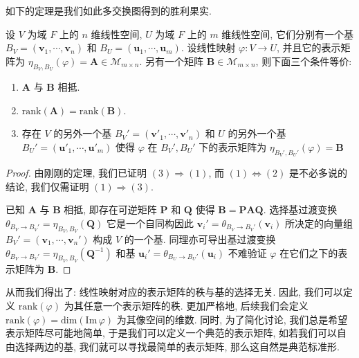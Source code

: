 \documentclass[UTF8]{book}
\begin{document}
如下的定理是我们如此多交换图得到的胜利果实. 

\begin{theorem}
    设 $V$ 为域 $F$ 上的 $n$ 维线性空间, 
    $U$ 为域 $F$ 上的 $m$ 维线性空间, 它们分别有一个基 
    $B_V=(\boldsymbol{v}_1,\cdots,\boldsymbol{v}_n)$ 
    和 $B_U=(\boldsymbol{u}_1,\cdots,\boldsymbol{u}_m)$. 
    设线性映射 $\varphi : V \to U$, 并且它的表示矩阵为 
    $\eta_{B_V,B_U}(\varphi) =\boldsymbol{A} \in 
    \mathcal{M}_{m\times n}$. 
    另有一个矩阵 $\boldsymbol{B} \in \mathcal{M}_{m\times n} $, 
    则下面三个条件等价: 
    \begin{enumerate}[(1)]
        \item $\boldsymbol{A}$ 与 $\boldsymbol{B}$ 相抵. 
        \item $\mathrm{rank}(\boldsymbol{A})=
        \mathrm{rank}(\boldsymbol{B})$. 
        \item 存在 $V$ 的另外一个基 
        $B_V'=(\boldsymbol{v}'_1,\cdots,\boldsymbol{v}'_n)$ 
        和 $U$ 的另外一个基 
        $B_U'=(\boldsymbol{u}'_1,\cdots,\boldsymbol{u}'_m)$ 
        使得 $\varphi$ 在 $B_V',B_U'$ 下的表示矩阵为 
        $\eta_{B_V',B_U'}(\varphi) = \boldsymbol{B}$
    \end{enumerate}
\end{theorem}

\begin{proof}
    由刚刚的定理, 我们已证明 $(3) \Rightarrow (1)$, 
    而 $(1)\Leftrightarrow(2)$ 是不必多说的结论, 
    我们仅需证明 $(1) \Rightarrow (3)$. 

    已知 $\boldsymbol{A}$ 与 $\boldsymbol{B}$ 相抵, 
    即存在可逆矩阵 $\boldsymbol{P}$ 和 $\boldsymbol{Q}$ 
    使得 $\boldsymbol{B} = \boldsymbol{P}\boldsymbol{A}\boldsymbol{Q}$. 
    选择基过渡变换 
    $\theta_{B_V \to B_V'} = \eta_{B_V,B_V}(\boldsymbol{Q})$ 
    它是一个自同构因此 
    $\boldsymbol{v}_i' = \theta_{B_V \to B_V'}(\boldsymbol{v}_i)$ 
    所决定的向量组 $B_V'= (\boldsymbol{v}_1,\cdots,\boldsymbol{v}_n')$ 
    构成 $V$ 的一个基. 
    同理亦可导出基过渡变换 
    $\theta_{B_V \to B_V'} = \eta_{B_V,B_V}(\boldsymbol{Q}^{-1})$ 
    和基 
    $\boldsymbol{u}_i' = \theta_{B_U \to B_U'}(\boldsymbol{u}_i)$ 
    不难验证 $\varphi$ 在它们之下的表示矩阵为 $\boldsymbol{B}$. 

\end{proof}

从而我们得出了: 线性映射对应的表示矩阵的秩与基的选择无关. 
因此, 我们可以定义 $\mathrm{rank}(\varphi)$ 为其任意一个表示矩阵的秩. 
更加严格地, 后续我们会定义 
$\mathrm{rank}(\varphi) = \mathrm{dim}(\mathrm{Im}\,\varphi)$ 
为其像空间的维数. 
同时, 为了简化讨论, 我们总是希望表示矩阵尽可能地简单, 
于是我们可以定义一个典范的表示矩阵, 如若我们可以自由选择两边的基, 
我们就可以寻找最简单的表示矩阵, 那么这自然是典范标准形. 
\end{document}
